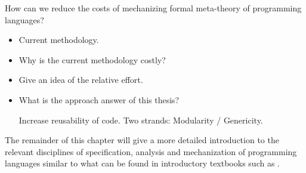 {\begin{center}
  \begin{minipage}{0.8\columnwidth}
    How can we reduce the costs of mechanizing formal meta-theory of programming
    languages?
  \end{minipage}
\end{center}

\begin{itemize}
\item Current methodology.
\item Why is the current methodology costly?
\item Give an idea of the relative effort.
\item What is the approach answer of this thesis?

  Increase reusability of code. Two strands: Modularity / Genericity.
\end{itemize}




The remainder of this chapter will give a more detailed introduction to the
relevant disciplines of specification, analysis and mechanization of programming
languages similar to what can be found in introductory textbooks such as
\cite{tapl}.



}
